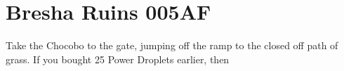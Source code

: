 \chapter{Bresha Ruins 005AF}

Take the Chocobo to the gate, jumping off the ramp to the closed off path of grass. 
If you bought 25 Power Droplets earlier, then 
\newline